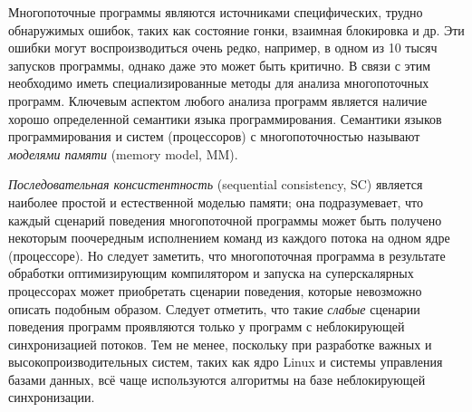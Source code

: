 
{\actuality}
Многопоточные программы являются источниками специфических,
трудно обнаружимых ошибок,
таких как состояние гонки, взаимная блокировка и др.
Эти ошибки могут воспроизводиться очень редко, например, в одном из 10 тысяч запусков
программы, однако даже это может быть критично.
В связи с этим необходимо иметь специализированные методы для анализа многопоточных программ.
Ключевым аспектом любого анализа программ является наличие хорошо определенной семантики языка программирования.
Семантики языков программирования и систем (процессоров) с многопоточностью называют \emph{моделями памяти} (memory model, MM).

\emph{Последовательная консистентность} (sequential consistency, SC) 
является наиболее простой и естественной моделью памяти;
она подразумевает, что каждый сценарий поведения многопоточной программы может быть
получено некоторым поочередным исполнением команд из каждого потока на одном ядре
(процессоре). Но следует заметить, что многопоточная программа в результате обработки оптимизирующим
компилятором и запуска на суперскалярных процессорах может приобретать сценарии поведения,
которые невозможно описать подобным образом.
Следует отметить, что такие \emph{слабые} сценарии поведения программ проявляются
только у программ с неблокирующей синхронизацией потоков. Тем не менее, поскольку при разработке
важных и высокопроизводительных систем, таких как ядро Linux и системы управления базами данных, всё чаще используются
алгоритмы на базе неблокирующей синхронизации. 


